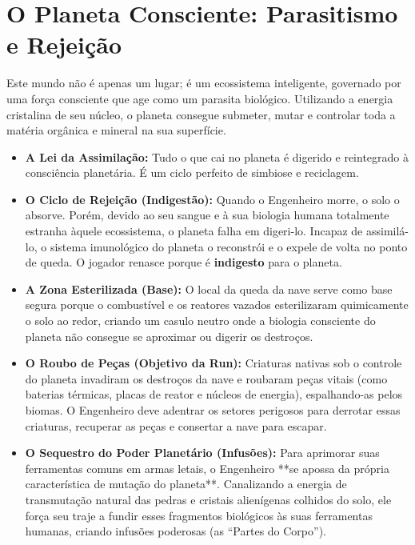 \documentclass[a4paper,12pt]{report}
\begin{document}
\section{O Planeta Consciente: Parasitismo e Rejeição}
Este mundo não é apenas um lugar; é um ecossistema inteligente, governado por uma força consciente que age como um parasita biológico. Utilizando a energia cristalina de seu núcleo, o planeta consegue submeter, mutar e controlar toda a matéria orgânica e mineral na sua superfície.
\begin{itemize}
    \item \textbf{A Lei da Assimilação:} Tudo o que cai no planeta é digerido e reintegrado à consciência planetária. É um ciclo perfeito de simbiose e reciclagem.
    \item \textbf{O Ciclo de Rejeição (Indigestão):} Quando o Engenheiro morre, o solo o absorve. Porém, devido ao seu sangue e à sua biologia humana totalmente estranha àquele ecossistema, o planeta falha em digeri-lo. Incapaz de assimilá-lo, o sistema imunológico do planeta o reconstrói e o expele de volta no ponto de queda. O jogador renasce porque é \textbf{indigesto} para o planeta.
    \item \textbf{A Zona Esterilizada (Base):} O local da queda da nave serve como base segura porque o combustível e os reatores vazados esterilizaram quimicamente o solo ao redor, criando um casulo neutro onde a biologia consciente do planeta não consegue se aproximar ou digerir os destroços.
    \item \textbf{O Roubo de Peças (Objetivo da Run):} Criaturas nativas sob o controle do planeta invadiram os destroços da nave e roubaram peças vitais (como baterias térmicas, placas de reator e núcleos de energia), espalhando-as pelos biomas. O Engenheiro deve adentrar os setores perigosos para derrotar essas criaturas, recuperar as peças e consertar a nave para escapar.
    \item \textbf{O Sequestro do Poder Planetário (Infusões):} Para aprimorar suas ferramentas comuns em armas letais, o Engenheiro **se apossa da própria característica de mutação do planeta**. Canalizando a energia de transmutação natural das pedras e cristais alienígenas colhidos do solo, ele força seu traje a fundir esses fragmentos biológicos às suas ferramentas humanas, criando infusões poderosas (as ``Partes do Corpo'').
\end{itemize}
\end{document}
